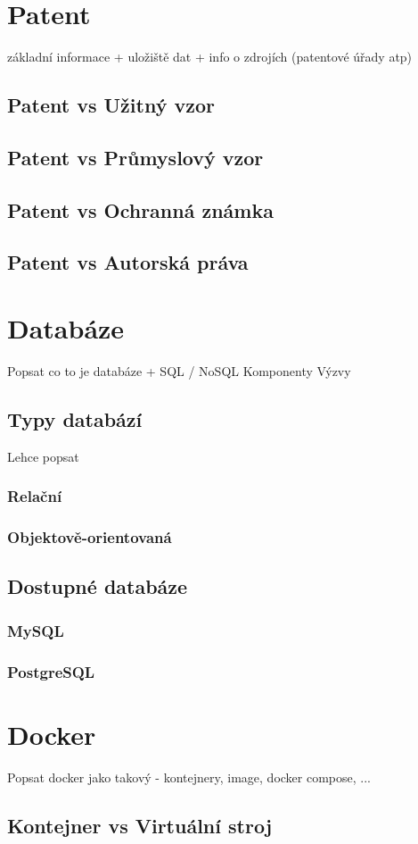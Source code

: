 \chapter{Patent}
základní informace + uložiště dat + info o zdrojích (patentové úřady atp) \newline
\section{Patent vs Užitný vzor}
\section{Patent vs Průmyslový vzor}
\section{Patent vs Ochranná známka}
\section{Patent vs Autorská práva}



\chapter{Databáze}
Popsat co to je databáze + SQL / NoSQL\newline
Komponenty \newline
Výzvy
\section{Typy databází}
Lehce popsat
\subsection{Relační}
\subsection{Objektově-orientovaná}
\section{Dostupné databáze}
\subsection{MySQL}
\subsection{PostgreSQL}


\chapter{Docker}
Popsat docker jako takový - kontejnery, image, docker compose, ...\newline
\section{Kontejner vs Virtuální stroj}